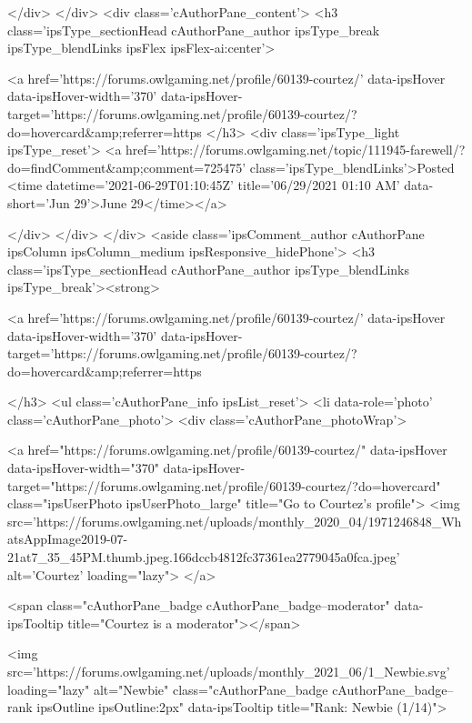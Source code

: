			</div>
		</div>
		<div class='cAuthorPane_content'>
			<h3 class='ipsType_sectionHead cAuthorPane_author ipsType_break ipsType_blendLinks ipsFlex ipsFlex-ai:center'>
				


<a href='https://forums.owlgaming.net/profile/60139-courtez/' data-ipsHover data-ipsHover-width='370' data-ipsHover-target='https://forums.owlgaming.net/profile/60139-courtez/?do=hovercard&amp;referrer=https%
			</h3>
			<div class='ipsType_light ipsType_reset'>
				<a href='https://forums.owlgaming.net/topic/111945-farewell/?do=findComment&amp;comment=725475' class='ipsType_blendLinks'>Posted <time datetime='2021-06-29T01:10:45Z' title='06/29/2021 01:10  AM' data-short='Jun 29'>June 29</time></a>
				
			</div>
		</div>
	</div>
	<aside class='ipsComment_author cAuthorPane ipsColumn ipsColumn_medium ipsResponsive_hidePhone'>
		<h3 class='ipsType_sectionHead cAuthorPane_author ipsType_blendLinks ipsType_break'><strong>


<a href='https://forums.owlgaming.net/profile/60139-courtez/' data-ipsHover data-ipsHover-width='370' data-ipsHover-target='https://forums.owlgaming.net/profile/60139-courtez/?do=hovercard&amp;referrer=https%
			
		</h3>
		<ul class='cAuthorPane_info ipsList_reset'>
			<li data-role='photo' class='cAuthorPane_photo'>
				<div class='cAuthorPane_photoWrap'>
					


	<a href="https://forums.owlgaming.net/profile/60139-courtez/" data-ipsHover data-ipsHover-width="370" data-ipsHover-target="https://forums.owlgaming.net/profile/60139-courtez/?do=hovercard" class="ipsUserPhoto ipsUserPhoto_large" title="Go to Courtez's profile">
		<img src='https://forums.owlgaming.net/uploads/monthly_2020_04/1971246848_WhatsAppImage2019-07-21at7_35_45PM.thumb.jpeg.166dccb4812fc37361ea2779045a0fca.jpeg' alt='Courtez' loading="lazy">
	</a>

					
						<span class="cAuthorPane_badge cAuthorPane_badge--moderator" data-ipsTooltip title="Courtez is a moderator"></span>
					
					
						
<img src='https://forums.owlgaming.net/uploads/monthly_2021_06/1_Newbie.svg' loading="lazy" alt="Newbie" class="cAuthorPane_badge cAuthorPane_badge--rank ipsOutline ipsOutline:2px" data-ipsTooltip title="Rank: Newbie (1/14)">
					
